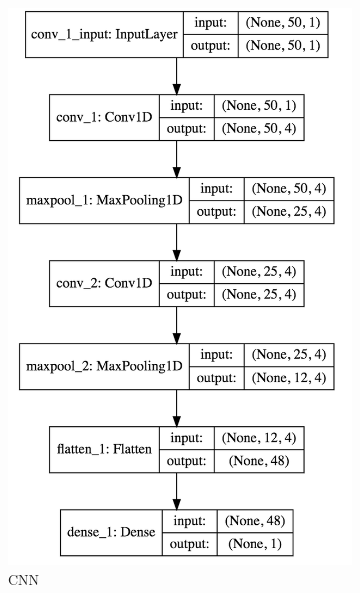 \documentclass[11pt]{article}
\begin{document}
\begin{figure}
    \centering
    \begin{subfigure}[b]{0.3\textwidth}
        \includegraphics[width=\textwidth]{media/cnn-network}
        \caption{CNN}
        \label{fig:cnn-architecture}
    \end{subfigure}
    ~ %
    \begin{subfigure}[b]{0.3\textwidth}

\end{subfigure}
\end{figure}
\end{document}
